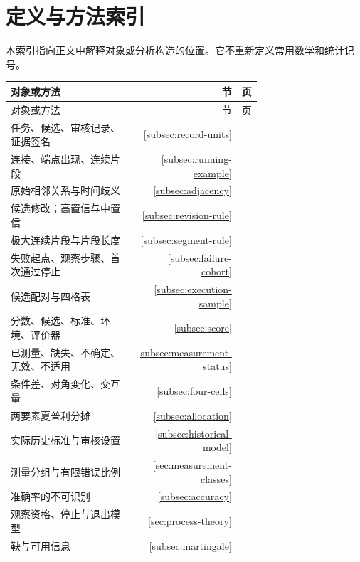 \section{定义与方法索引}
\label{sec:definition-index}
本索引指向正文中解释对象或分析构造的位置。它不重新定义常用数学和统计记号。
\small
\begin{longtable}{p{0.70\linewidth}rr}
\toprule
对象或方法 & 节 & 页\\
\midrule
\endfirsthead
\toprule
对象或方法 & 节 & 页\\
\midrule
\endhead
\bottomrule
\endfoot
任务、候选、审核记录、证据签名 & \ref{subsec:record-units} & \pageref{subsec:record-units} \\
连接、端点出现、连续片段 & \ref{subsec:running-example} & \pageref{subsec:running-example} \\
原始相邻关系与时间歧义 & \ref{subsec:adjacency} & \pageref{subsec:adjacency} \\
候选修改；高置信与中置信 & \ref{subsec:revision-rule} & \pageref{subsec:revision-rule} \\
极大连续片段与片段长度 & \ref{subsec:segment-rule} & \pageref{subsec:segment-rule} \\
失败起点、观察步骤、首次通过停止 & \ref{subsec:failure-cohort} & \pageref{subsec:failure-cohort} \\
候选配对与四格表 & \ref{subsec:execution-sample} & \pageref{subsec:execution-sample} \\
分数、候选、标准、环境、评价器 & \ref{subsec:score} & \pageref{subsec:score} \\
已测量、缺失、不确定、无效、不适用 & \ref{subsec:measurement-status} & \pageref{subsec:measurement-status} \\
条件差、对角变化、交互量 & \ref{subsec:four-cells} & \pageref{subsec:four-cells} \\
两要素夏普利分摊 & \ref{subsec:allocation} & \pageref{subsec:allocation} \\
实际历史标准与审核设置 & \ref{subsec:historical-model} & \pageref{subsec:historical-model} \\
测量分组与有限错误比例 & \ref{sec:measurement-classes} & \pageref{sec:measurement-classes} \\
准确率的不可识别 & \ref{subsec:accuracy} & \pageref{subsec:accuracy} \\
观察资格、停止与退出模型 & \ref{sec:process-theory} & \pageref{sec:process-theory} \\
鞅与可用信息 & \ref{subsec:martingale} & \pageref{subsec:martingale} \\

\end{longtable}
